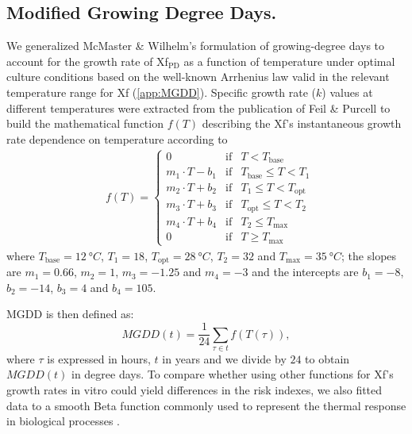 \subsection{Modified Growing Degree Days.}

We generalized McMaster \& Wilhelm’s \cite{McMaster1997} formulation of
growing-degree days to account for the growth rate of Xf$_{\textrm{PD}}$ as a
function of temperature under optimal culture conditions based on the
well-known Arrhenius law valid in the relevant temperature range for Xf
(\cref{app:MGDD}). Specific growth rate ($k$) values at different temperatures
were extracted from the publication of Feil \& Purcell \cite{Feil2001} to build
the mathematical function $f(T)$ describing the Xf’s instantaneous growth rate
dependence on temperature according to
\begin{align*}
     & f(T)=\left\{\begin{array}{lll}
                       0                & \textrm{if} & T<T_{\textrm{base}}
                       \\
                       m_1\cdot T-b_1   & \textrm{if} & T_{\textrm{base}}
                       \leq T < T_1
                       \\
                       m_2\cdot T + b_2 & \textrm{if} & T_{1} \leq T <
                       T_{\textrm{opt}}
                       \\
                       m_3\cdot T + b_3 & \textrm{if} & T_{\textrm{opt}}
                       \leq T < T_2
                       \\
                       m_4\cdot T + b_4 & \textrm{if} & T_2 \leq
                       T_{\textrm{max}}
                       \\
                       0                & \textrm{if} & T\geq
                       T_{\textrm{max}}
                   \end{array}\right. \,
\end{align*}
where $T_{\textrm{base}}=\SI{12}{\degree C}$, $T_1=18$,
$T_{\textrm{opt}}=\SI{28}{\degree C}$,	$T_2=32$ and
$T_{\textrm{max}}=\SI{35}{\degree C}$; the slopes are $m_1= 0.66$, $m_2=1$,
$m_3=-1.25$ and $m_4=-3$ and the intercepts are $b_1=-8$, $b_2=-14$, $b_3=4$
and $b_4=105$.

MGDD is then defined as:
\begin{equation}\label{eq:MGDD_def}
    MGDD(t) = \frac{1}{24}\sum_{\tau \in t} f(T(\tau)),
\end{equation}
where $\tau$ is expressed in hours, $t$ in years and we divide by $24$ to
obtain $MGDD(t)$ in degree days. To compare whether using other functions
for Xf's growth rates in vitro could yield differences in the risk indexes, we
also fitted data to a smooth Beta function commonly used to represent the
thermal response in biological processes \cite{Yan1999,Magarey2005}.

